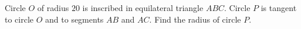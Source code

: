 Circle $O$ of radius $20$ is inscribed in equilateral triangle $ABC$. Circle $P$ is tangent to circle $O$ and to segments $AB$ and $AC$. Find the radius of circle $P$.
